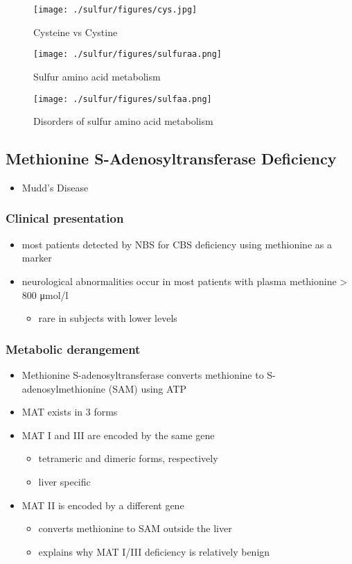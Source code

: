 \documentclass{scrartcl}
\begin{document}
\begin{figure}[htbp]
\centering
\texttt{[image: ./sulfur/figures/cys.jpg]}
\caption{\label{fig:org365405b}
Cysteine vs Cystine}
\end{figure}

\begin{figure}[htbp]
\centering
\texttt{[image: ./sulfur/figures/sulfuraa.png]}
\caption{\label{fig:org21b79d4}
Sulfur amino acid metabolism}
\end{figure}

\begin{figure}[htbp]
\centering
\texttt{[image: ./sulfur/figures/sulfaa.png]}
\caption{\label{fig:orgee6621c}
Disorders of sulfur amino acid metabolism}
\end{figure}

\subsection{Methionine S-Adenosyltransferase Deficiency}
\label{sec:org0a4bc11}
\begin{itemize}
\item Mudd’s Disease
\end{itemize}
\subsubsection{Clinical presentation}
\label{sec:orga83172c}
\begin{itemize}
\item most patients detected by NBS for CBS deficiency using methionine as a marker
\item neurological abnormalities occur in most patients with plasma methionine \textgreater{} 800 μmol/l
\begin{itemize}
\item rare in subjects with lower levels
\end{itemize}
\end{itemize}
\subsubsection{Metabolic derangement}
\label{sec:orgbe569bd}
\begin{itemize}
\item Methionine S-adenosyltransferase converts methionine to S-adenosylmethionine (SAM) using ATP
\item MAT exists in 3 forms
\item MAT I and III are encoded by the same gene
\begin{itemize}
\item tetrameric and dimeric forms, respectively
\item liver specific
\end{itemize}
\item MAT II is encoded by a different gene
\begin{itemize}
\item converts methionine to SAM outside the liver
\item explains why MAT I/III deficiency is relatively benign
\end{itemize}
\end{itemize}
\end{document}
